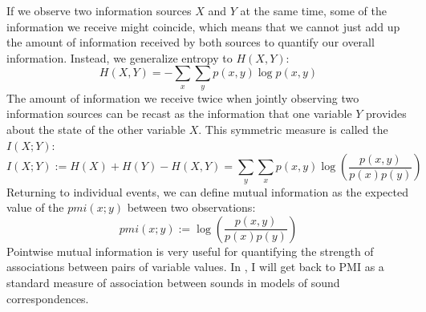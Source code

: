 If we observe two information sources $X$ and $Y$ at the same time, some of the information we receive might coincide, which means that we cannot just add up the amount of information received by both sources to quantify our overall information. Instead, we generalize entropy to \textit{} $H(X,Y)$:
 \begin{equation*}
  H(X,Y) = -\sum_{x} \sum_{y} p(x,y) \log p(x,y)
 \end{equation*}
The amount of information we receive twice when jointly observing two information sources can be recast as the information
that one variable $Y$ provides about the state of the other variable $X$. This symmetric measure
is called the \textit{} $I(X;Y)$:
 \begin{equation*}
  I(X;Y) := H(X) + H(Y) - H(X,Y) = \sum_{y} \sum_{x} p(x,y) \log \left( \frac{p(x,y)}{p(x)p(y)} \right) 
 \end{equation*}
Returning to individual events, we can define mutual information as the expected value of the \textit{} $pmi(x;y)$
between two observations:
 \begin{equation*}
  pmi(x;y) := \log \left( \frac{p(x,y)}{p(x)p(y)} \right) 
 \end{equation*}
Pointwise mutual information is very useful for quantifying the strength of associations between
pairs of variable values. In , I will get back to PMI as a standard measure 
of association between sounds in models of sound correspondences.

